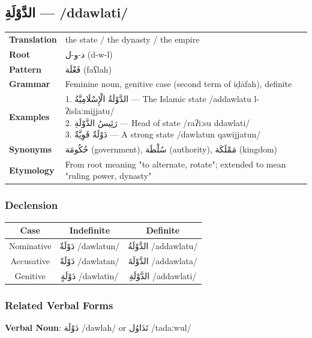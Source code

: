 \documentclass[letterpaper,12pt]{article}
\begin{document}
\subsection{\textarabic{الدَّوْلَةِ} — /ddawlati/}
\begin{tabular}{p{3cm}p{10cm}}
\toprule
\textbf{Translation} & the state / the dynasty / the empire \\
\textbf{Root} & \textarabic{د-و-ل} (d-w-l) \\
\textbf{Pattern} & \textarabic{فَعْلَة} (faʕlah) \\
\textbf{Grammar} & Feminine noun, genitive case (second term of iḍāfah), definite \\
\midrule
\textbf{Examples} & \makecell[l]{\parbox{9.5cm}{
1. \textarabic{الدَّوْلَةُ الْإِسْلَامِيَّةُ} — The Islamic state /addawlatu l-ʔislaːmijjatu/\\
2. \textarabic{رَئِيسُ الدَّوْلَةِ} — Head of state /raʔiːsu ddawlati/\\
3. \textarabic{دَوْلَةٌ قَوِيَّةٌ} — A strong state /dawlatun qawijjatun/
}} \\
\midrule
\textbf{Synonyms} & \textarabic{حُكُومَة} (government), \textarabic{سُلْطَة} (authority), \textarabic{مَمْلَكَة} (kingdom) \\
\textbf{Etymology} & From root meaning "to alternate, rotate"; extended to mean "ruling power, dynasty" \\
\bottomrule
\end{tabular}

\subsubsection*{Declension}
\begin{tabular}{|c|c|c|}
\hline
\textbf{Case} & \textbf{Indefinite} & \textbf{Definite} \\
\hline
Nominative & \textarabic{دَوْلَةٌ} /dawlatun/ & \textarabic{الدَّوْلَةُ} /addawlatu/ \\
\hline
Accusative & \textarabic{دَوْلَةً} /dawlatan/ & \textarabic{الدَّوْلَةَ} /addawlata/ \\
\hline
Genitive & \textarabic{دَوْلَةٍ} /dawlatin/ & \textarabic{الدَّوْلَةِ} /addawlati/ \\
\hline
\end{tabular}

\subsubsection*{Related Verbal Forms}
\par{\large \textbf{Verbal Noun}: \textarabic{دَوْلَة} /dawlah/ or \textarabic{تَدَاوُل} /tadaːwul/}
\end{document}
